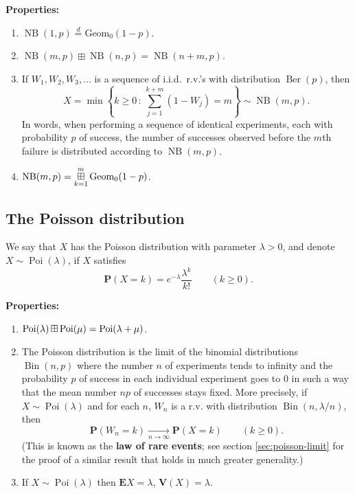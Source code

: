 \documentclass[12pt]{article}
\newcommand{\prob}{\mathbf{P}}
\newcommand{\expec}{\mathbf{E}}
\newcommand{\var}{\mathbf{V}}
\newcommand{\eqdist}{\stackrel{d}{=}}
\newcommand{\indplus}{\boxplus}
\newcommand{\indsum}{\displaystyle \mathop{\boxplus}\displaylimits}
\newcommand{\berdist}{\operatorname{Ber}}
\newcommand{\bindist}{\operatorname{Bin}}
\newcommand{\geomzdist}{\operatorname{Geom_0}}
\newcommand{\nbdist}{\operatorname{NB}}
\newcommand{\poissondist}{\operatorname{Poi}}
\theoremstyle{example}
\begin{document}
\noindent \textbf{Properties:}
\begin{enumerate}

\item $\nbdist(1,p) \eqdist \geomzdist(1-p)$.

\item $\nbdist(m,p) \indplus \nbdist(n,p) = \nbdist(n+m,p)$.

\item If $W_1,W_2,W_3, \ldots$ is a sequence of i.i.d.\ r.v.'s with distribution $\berdist(p)$, then
$$ X = \min\left\{ k\ge 0\,:\, \sum_{j=1}^{k+m} (1-W_j) = m\right\}  \sim \nbdist(m,p). $$
In words, when performing a sequence of identical experiments, each with probability $p$ of success, the number of successes observed before the $m$th failure is distributed according to $\nbdist(m,p)$.

\item $\nbdist(m,p) = \indsum_{k=1}^m \geomzdist(1-p)$.


\end{enumerate}



\subsection{The Poisson distribution}

We say that $X$ has the Poisson distribution with parameter $\lambda>0$, and denote $X\sim \poissondist(\lambda)$, if $X$ satisfies
$$
\prob(X=k) = e^{-\lambda} \frac{\lambda^k}{k!} \qquad (k\ge 0).
$$

\noindent \textbf{Properties:}
\begin{enumerate}

\item $\poissondist(\lambda) \indsum \poissondist(\mu) = \poissondist(\lambda+\mu)$.

\item The Poisson distribution is the limit of the binomial distributions $\bindist(n,p)$ where the number $n$ of experiments tends to infinity and the probability $p$ of success in each individual experiment goes to $0$ in such a way that the mean number $np$ of successes stays fixed. More precisely, if $X\sim \poissondist(\lambda)$ and for each $n$, $W_n$ is a r.v. with distribution $\bindist(n,\lambda/n)$, then
$$ \prob(W_n = k) \xrightarrow[n\to\infty]{} \prob(X=k) \qquad (k\ge 0).
$$
(This is known as the \textbf{law of rare events}; see section \ref{sec:poisson-limit} for the proof of a similar result that holds in much greater generality.)

\item If $X \sim \poissondist(\lambda)$ then $\expec X = \lambda$, $\var(X)=\lambda$.

\end{enumerate}
\end{document}
